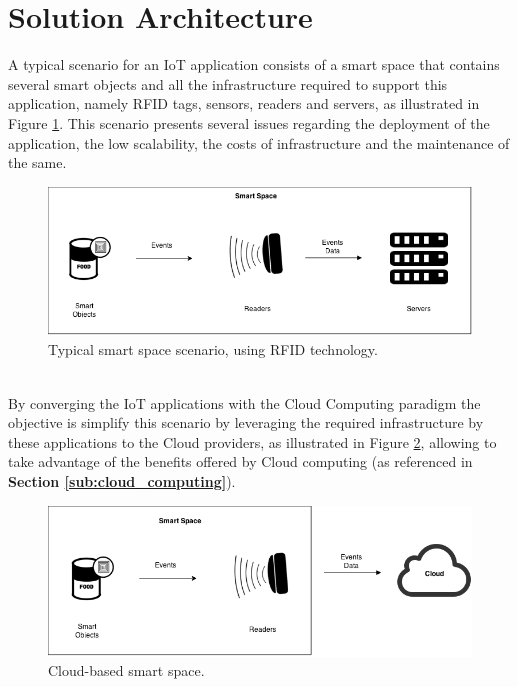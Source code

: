 \section{Solution Architecture}
\label{sec:solution_architecture}
A typical scenario for an IoT application consists of a smart space that contains several smart objects and all
the infrastructure required to support this application, namely RFID tags, sensors, readers and servers, as
illustrated in Figure \ref{fig:smart-space}. This scenario presents several issues regarding the deployment
of the application, the low scalability, the costs of infrastructure and the maintenance of the same.
\begin{figure}[h!]
  \centering
  \includegraphics[width=\textwidth]{./images/smart-space}
  \caption{Typical smart space scenario, using RFID technology.}
  \label{fig:smart-space}
\end{figure}\\
By converging the IoT applications with the Cloud Computing paradigm the objective is simplify this scenario by
leveraging the required infrastructure by these applications to the Cloud providers, as illustrated in
Figure \ref{fig:smart-space-cloud}, allowing to take advantage of the benefits offered by Cloud computing
(as referenced in \textbf{Section \ref{sub:cloud_computing}}).
\begin{figure}
  \centering
  \includegraphics[width=\textwidth]{./images/smart-space-cloud}
  \caption{Cloud-based smart space.}
  \label{fig:smart-space-cloud}
\end{figure}\\
